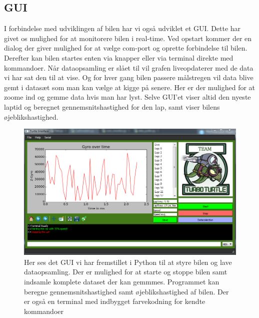 \subsection{GUI}
I forbindelse med udviklingen af bilen har vi også udviklet et GUI. Dette har givet os mulighed for at monitorere bilen i real-time. Ved opstart kommer der en dialog der giver mulighed for at vælge com-port og oprette forbindelse til bilen. Derefter kan bilen startes enten via knapper eller via terminal direkte med kommandoer. Når dataopsamling er slået til vil grafen liveopdaterer med de data vi har sat den til at vise. Og for hver gang bilen passere målstregen vil data blive gemt i datasæt som man kan vælge at kigge på senere. Her er der mulighed for at zoome ind og gemme data hvis man har lyst. Selve GUI'et viser altid den nyeste laptid og beregnet gennemsnitshastighed for den lap, samt viser bilens øjeblikshastighed.

\begin{figure}[h]
	\centering
		\includegraphics[scale=0.60]{Billeder/Application.png}
	\caption{Her ses det GUI vi har fremstillet i Python til at styre bilen og lave dataopsamling. Der er mulighed for at 				starte og stoppe bilen samt indsamle komplete dataset der kan gemmmes. Programmet kan beregne gennemsnitshastighed 				samt øjeblikshastighed af bilen. Der er også en terminal med indbygget farvekodning for kendte kommandoer}
	\label{fig:Application}
\end{figure}

